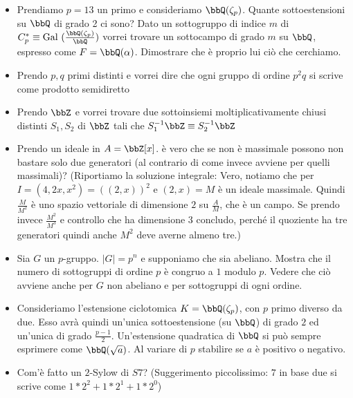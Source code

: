 \documentclass[a4paper,11pt,NoNotes,GeneralMath]{stdmdoc}
\newcommand{\Gal}{\text{Gal }}
\begin{document}
\begin{itemize}
        \item Prendiamo $p=13$ un primo e consideriamo $\bbQ(\zeta_p)$. Quante sottoestensioni su $\bbQ$ di grado 2 ci sono? Dato un sottogruppo di indice $m$ di $C_p^{*} \equiv \Gal(\frac{\bbQ(\zeta_p)}{\bbQ})$ vorrei trovare un sottocampo di grado $m$ su $\bbQ$, espresso come $F = \bbQ(\alpha)$. Dimostrare che è proprio lui ciò che cerchiamo.
        \item Prendo $p, q$ primi distinti e vorrei dire che ogni gruppo di ordine $p^2 q$ si scrive come prodotto semidiretto
        \item Prendo $\bbZ$ e vorrei trovare due sottoinsiemi moltiplicativamente chiusi distinti $S_1, S_2$ di $\bbZ$ tali che $S_1^{-1} \bbZ \equiv S_2^{-1} \bbZ$
        \item Prendo un ideale in $A = \bbZ [x]$. è vero che se non è massimale possono non bastare solo due generatori (al contrario di come invece avviene per quelli massimali)? (Riportiamo la soluzione integrale: Vero, notiamo che per $I = (4, 2x, x^2) = ((2, x))^2 $ e $(2, x) = M$ è un ideale massimale. Quindi $\frac{M}{M^2}$ è uno spazio vettoriale di dimensione $2$ su $\frac{A}{M}$, che è un campo. Se prendo invece $\frac{M^2}{M^3}$ e controllo che ha dimensione 3 concludo, perché il quoziente ha tre generatori quindi anche $M^2$ deve averne almeno tre.)
		\item Sia $G$ un $p$-gruppo. $\mid G \mid = p^n$ e supponiamo che sia abeliano. Mostra che il numero di sottogruppi di ordine $p$ è congruo a $1$ modulo $p$. Vedere che ciò avviene anche per $G$ non abeliano e per sottogruppi di ogni ordine.
		\item Consideriamo l'estensione ciclotomica $K = \bbQ (\zeta_p)$, con $p$ primo diverso da due. Esso avrà quindi un'unica sottoestensione (su $\bbQ$) di grado $2$ ed un'unica di grado $\frac{p-1}{2}$. Un'estensione quadratica di $\bbQ$ si può sempre esprimere come $\bbQ(\sqrt{a})$. Al variare di $p$ stabilire se $a$ è positivo o negativo.
		\item Com'è fatto un $2$-Sylow di $S7$? (Suggerimento piccolissimo: $7$ in base due si scrive come $1*2^2 + 1 *2^1 + 1*2^0$)
    \end{itemize}
    
\end{document}
